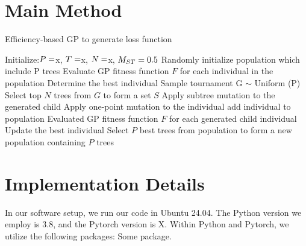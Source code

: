 \begin{ZhChapter}

    \section{Main Method}

    \begin{algorithm}
        \caption{Efficiency-based GP to generate loss function}\label{alg:cap}
        \begin{algorithmic}
            \State Initialize:$P = \space $x, $T =\space $x, $N = \space $x, $M_{ST} = \space0.5$
            \State Randomly initialize population which include P trees
            \State Evaluate GP fitness function $F$ for each individual in the population
            \State Determine the best individual
            \State Sample tournament G $\sim$ Uniform (P)
            \State Select top $N$ trees from $G$ to form a set $S$
            \State Apply subtree mutation to the generated child
            \Else
            \State Apply one-point mutation to the individual
            \EndIf
            \State add individual to population
            \EndIf
            \EndFor
            \State Evaluated GP fitness function $F$ for each generated child individual
            \State Update the best individual
            \State Select $P$ best trees from population to form a new population containing $P$ trees
            \EndWhile
        \end{algorithmic}
    \end{algorithm}

    \section{Implementation Details}
    In our software setup, we run our code in Ubuntu 24.04. The Python version we employ is 3.8, and the Pytorch version is X. Within Python and Pytorch, we utilize the following packages: Some package.


\end{ZhChapter}
